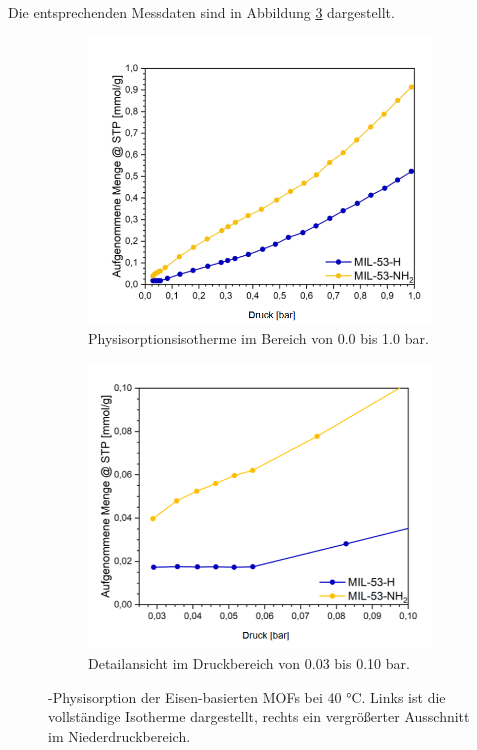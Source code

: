 \documentclass[12pt, a4paper]{article}
\begin{document}
\noindent
Die entsprechenden Messdaten sind in Abbildung \ref{Physisorption} dargestellt.
\begin{figure}[!h]
    \centering
  \begin{subfigure}[b]{0.47\linewidth}
    \centering
    \includegraphics[width=\textwidth]{Phsyioganz.png}
    \caption{Physisorptionsisotherme im Bereich von 0.0 bis 1.0 bar.}
    \label{ganz}
    
  \end{subfigure}
   \begin{subfigure}[b]{0.47\linewidth}
    \centering
    \includegraphics[width=\textwidth]{phsiozoom.png}
    \caption{Detailansicht im Druckbereich von 0.03 bis 0.10 bar.}
    \label{zoom}
    
  \end{subfigure}
  \caption{-Physisorption der Eisen-basierten MOFs bei 40 °C. Links ist die vollständige Isotherme dargestellt, rechts ein vergrößerter Ausschnitt im Niederdruckbereich.}
  \label{Physisorption}
\end{figure}
\end{document}
